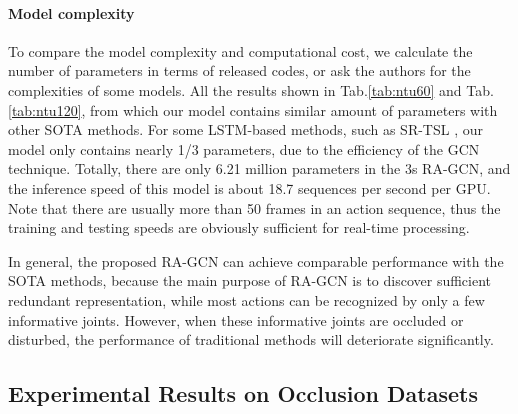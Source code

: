 \documentclass[journal]{IEEEtran}
\begin{document}
\paragraph{Model complexity} To compare the model complexity and computational cost, we calculate the number of parameters in terms of released codes, or ask the authors for the complexities of some models. All the results shown in Tab.\ref{tab:ntu60} and Tab.\ref{tab:ntu120}, from which our model contains similar amount of parameters with other SOTA methods. For some LSTM-based methods, such as SR-TSL \cite{si2018skeleton}, our model only contains nearly 1/3 parameters, due to the efficiency of the GCN technique. Totally, there are only 6.21 million parameters in the 3s RA-GCN, and the inference speed of this model is about 18.7 sequences per second per GPU. Note that there are usually more than 50 frames in an action sequence, thus the training and testing speeds are obviously sufficient for real-time processing.

In general, the proposed RA-GCN can achieve comparable performance with the SOTA methods, because the main purpose of RA-GCN is to discover sufficient redundant representation, while most actions can be recognized by only a few informative joints. However, when these informative joints are occluded or disturbed, the performance of traditional methods will deteriorate significantly.

\subsection{Experimental Results on Occlusion Datasets}
\label{ssec:occlusion}
\end{document}
